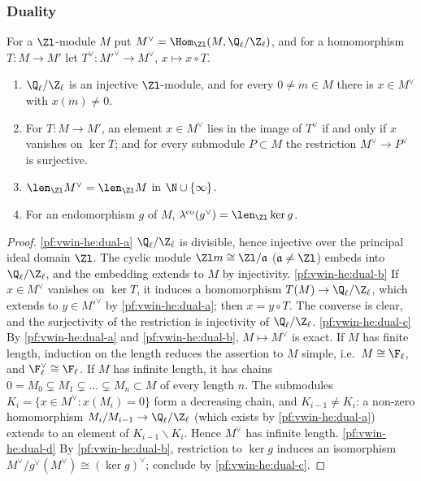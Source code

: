 \subsubsection{Duality}

For a $\Zl$-module $M$ put $M^\vee=\Hom_{\Zl}(M,\vwinheQZ)$, and for a homomorphism $T:M\to M'$ let
$T^\vee:M'^\vee\to M^\vee$, $x\mapsto x\circ T$.

\begin{lemma}\label{pf:vwin-he:dual}
\begin{enumerate}[label=(\alph*)]
\item\label{pf:vwin-he:dual-a} $\vwinheQZ$ is an injective $\Zl$-module, and for every $0\ne m\in M$ there is
$x\in M^\vee$ with $x(m)\ne0$.
\item\label{pf:vwin-he:dual-b} For $T:M\to M'$, an element $x\in M^\vee$ lies in the image of $T^\vee$ if and only if
$x$ vanishes on $\ker T$; and for every submodule $P\subset M$ the restriction $M^\vee\to P^\vee$ is surjective.
\item\label{pf:vwin-he:dual-c} $\len_{\Zl}M^\vee=\len_{\Zl}M$ in $\N\cup\{\infty\}$.
\item\label{pf:vwin-he:dual-d} For an endomorphism $g$ of $M$, $\vwinhecoker(g^\vee)=\len_{\Zl}\ker g$.
\end{enumerate}
\end{lemma}

\begin{proof}
\ref{pf:vwin-he:dual-a} $\vwinheQZ$ is divisible, hence injective over the principal ideal domain $\Zl$. The cyclic
module $\Zl m\cong\Zl/\mathfrak a$ ($\mathfrak a\ne\Zl$) embeds into $\vwinheQZ$, and the embedding extends to $M$ by
injectivity.
\ref{pf:vwin-he:dual-b} If $x\in M^\vee$ vanishes on $\ker T$, it induces a homomorphism $T(M)\to\vwinheQZ$, which
extends to $y\in M'^\vee$ by \ref{pf:vwin-he:dual-a}; then $x=y\circ T$. The converse is clear, and the surjectivity
of the restriction is injectivity of $\vwinheQZ$.
\ref{pf:vwin-he:dual-c} By \ref{pf:vwin-he:dual-a} and \ref{pf:vwin-he:dual-b}, $M\mapsto M^\vee$ is exact. If $M$ has
finite length, induction on the length reduces the assertion to $M$ simple, i.e.\ $M\cong\F_\ell$, and
$\F_\ell^\vee\cong\F_\ell$. If $M$ has infinite length, it has chains $0=M_0\subsetneq M_1\subsetneq\dots\subsetneq
M_n\subset M$ of every length $n$. The submodules $K_i=\{x\in M^\vee:x(M_i)=0\}$ form a decreasing chain, and
$K_{i-1}\ne K_i$: a non-zero homomorphism $M_i/M_{i-1}\to\vwinheQZ$ (which exists by \ref{pf:vwin-he:dual-a})
extends to an element of $K_{i-1}\smallsetminus K_i$. Hence $M^\vee$ has infinite length.
\ref{pf:vwin-he:dual-d} By \ref{pf:vwin-he:dual-b}, restriction to $\ker g$ induces an isomorphism
$M^\vee/g^\vee(M^\vee)\cong(\ker g)^\vee$; conclude by \ref{pf:vwin-he:dual-c}.
\end{proof}

